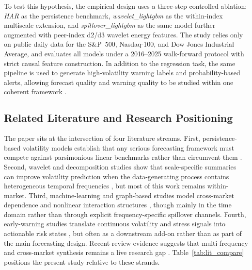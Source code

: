 To test this hypothesis, the empirical design uses a three-step controlled ablation: \textit{HAR} as the persistence benchmark, \textit{wavelet\_lightgbm} as the within-index multiscale extension, and \textit{spillover\_lightgbm} as the same model further augmented with peer-index d2/d3 wavelet energy features. The study relies only on public daily data for the S\&P~500, Nasdaq-100, and Dow Jones Industrial Average, and evaluates all models under a 2016--2025 walk-forward protocol with strict causal feature construction. In addition to the regression task, the same pipeline is used to generate high-volatility warning labels and probability-based alerts, allowing forecast quality and warning quality to be studied within one coherent framework \cite{ren2024extreme,ran2024earlywarning,purnell2024explainable}.

\subsection{Related Literature and Research Positioning}

The paper sits at the intersection of four literature streams. First, persistence-based volatility models establish that any serious forecasting framework must compete against parsimonious linear benchmarks rather than circumvent them \cite{corsi2008har,song2022garchmidas,branco2024linear}. Second, wavelet and decomposition studies show that scale-specific summaries can improve volatility prediction when the data-generating process contains heterogeneous temporal frequencies \cite{souropanis2023wavelet,zhuo2024harsvr,ma2025autoformerapplsci,su2025hybridapplsci}, but most of this work remains within-market. Third, machine-learning and graph-based studies model cross-market dependence and nonlinear interaction structures \cite{diaz2024mlvalue,son2023gnnspillover,song2023cnn_gru,chun2025timing}, though mainly in the time domain rather than through explicit frequency-specific spillover channels. Fourth, early-warning studies translate continuous volatility and stress signals into actionable risk states \cite{ren2024extreme,ran2024earlywarning,purnell2024explainable}, but often as a downstream add-on rather than as part of the main forecasting design. Recent review evidence suggests that multi-frequency and cross-market synthesis remains a live research gap \cite{leushuis2026review}. Table~\ref{tab:lit_compare} positions the present study relative to these strands.

